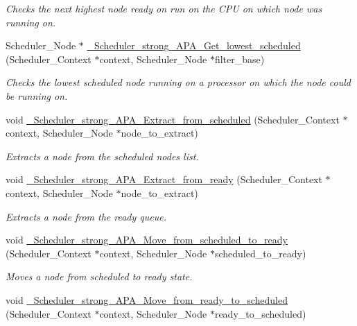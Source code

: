 \begin{DoxyCompactItemize}
\begin{DoxyCompactList}\small\item\em Checks the next highest node ready on run on the C\+PU on which  node was running on. \end{DoxyCompactList}\item 
Scheduler\+\_\+\+Node $\ast$ \hyperlink{group__RTEMSScoreSchedulerStrongAPA_ga26fb2df74c34c204d6f682ddae6b854d}{\+\_\+\+Scheduler\+\_\+strong\+\_\+\+A\+P\+A\+\_\+\+Get\+\_\+lowest\+\_\+scheduled} (Scheduler\+\_\+\+Context $\ast$context, Scheduler\+\_\+\+Node $\ast$filter\+\_\+base)
\begin{DoxyCompactList}\small\item\em Checks the lowest scheduled node running on a processor on which the  node could be running on. \end{DoxyCompactList}\item 
void \hyperlink{group__RTEMSScoreSchedulerStrongAPA_ga1a1e006053c3a9d1ad1d85c591b0aed7}{\+\_\+\+Scheduler\+\_\+strong\+\_\+\+A\+P\+A\+\_\+\+Extract\+\_\+from\+\_\+scheduled} (Scheduler\+\_\+\+Context $\ast$context, Scheduler\+\_\+\+Node $\ast$node\+\_\+to\+\_\+extract)
\begin{DoxyCompactList}\small\item\em Extracts a node from the scheduled node\textquotesingle{}s list. \end{DoxyCompactList}\item 
void \hyperlink{group__RTEMSScoreSchedulerStrongAPA_ga63c55c0e7bf77912bce6a91a6c1e09bf}{\+\_\+\+Scheduler\+\_\+strong\+\_\+\+A\+P\+A\+\_\+\+Extract\+\_\+from\+\_\+ready} (Scheduler\+\_\+\+Context $\ast$context, Scheduler\+\_\+\+Node $\ast$node\+\_\+to\+\_\+extract)
\begin{DoxyCompactList}\small\item\em Extracts a node from the ready queue. \end{DoxyCompactList}\item 
void \hyperlink{group__RTEMSScoreSchedulerStrongAPA_ga9589d6542faf83879288d437ca84c907}{\+\_\+\+Scheduler\+\_\+strong\+\_\+\+A\+P\+A\+\_\+\+Move\+\_\+from\+\_\+scheduled\+\_\+to\+\_\+ready} (Scheduler\+\_\+\+Context $\ast$context, Scheduler\+\_\+\+Node $\ast$scheduled\+\_\+to\+\_\+ready)
\begin{DoxyCompactList}\small\item\em Moves a node from scheduled to ready state. \end{DoxyCompactList}\item 
void \hyperlink{group__RTEMSScoreSchedulerStrongAPA_ga070d66ff37f268ddbbff1b7e6ac27ee3}{\+\_\+\+Scheduler\+\_\+strong\+\_\+\+A\+P\+A\+\_\+\+Move\+\_\+from\+\_\+ready\+\_\+to\+\_\+scheduled} (Scheduler\+\_\+\+Context $\ast$context, Scheduler\+\_\+\+Node $\ast$ready\+\_\+to\+\_\+scheduled)

\end{DoxyCompactItemize}
